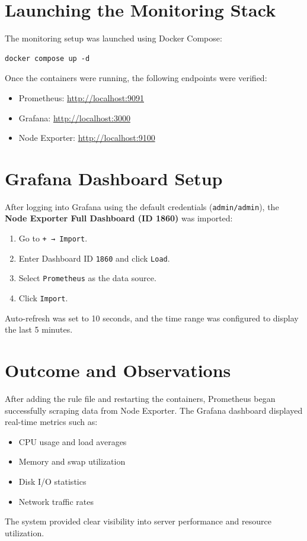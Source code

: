 \section{Launching the Monitoring Stack}
The monitoring setup was launched using Docker Compose:

\begin{verbatim}
docker compose up -d
\end{verbatim}

Once the containers were running, the following endpoints were verified:
\begin{itemize}
    \item Prometheus: \url{http://localhost:9091}
    \item Grafana: \url{http://localhost:3000}
    \item Node Exporter: \url{http://localhost:9100}
\end{itemize}

\section{Grafana Dashboard Setup}
After logging into Grafana using the default credentials (\texttt{admin/admin}), the \textbf{Node Exporter Full Dashboard (ID 1860)} was imported:

\begin{enumerate}
    \item Go to \texttt{+ → Import}.
    \item Enter Dashboard ID \texttt{1860} and click \texttt{Load}.
    \item Select \texttt{Prometheus} as the data source.
    \item Click \texttt{Import}.
\end{enumerate}

Auto-refresh was set to 10 seconds, and the time range was configured to display the last 5 minutes.

\section{Outcome and Observations}
After adding the rule file and restarting the containers, Prometheus began successfully scraping data from Node Exporter. The Grafana dashboard displayed real-time metrics such as:

\begin{itemize}
    \item CPU usage and load averages
    \item Memory and swap utilization
    \item Disk I/O statistics
    \item Network traffic rates
\end{itemize}

The system provided clear visibility into server performance and resource utilization.